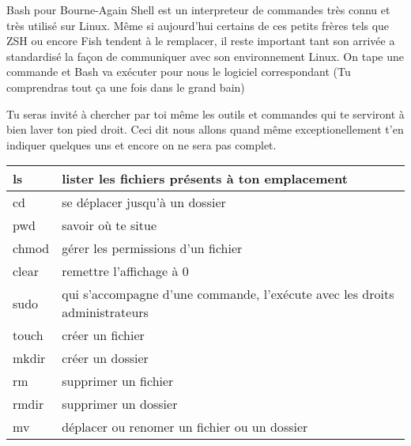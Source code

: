 \documentclass[a4paper, 12pt]{article}
\begin{document}
{\comfortaa

    Bash pour Bourne-Again Shell est un interpreteur de commandes très connu et très utilisé sur Linux. Même si aujourd'hui
    certains de ces petits frères tels que ZSH ou encore Fish tendent à le remplacer, il reste important tant
    son arrivée a standardisé la façon de communiquer avec son environnement Linux.
    \newline \newline
    On tape une commande et Bash va exécuter pour nous le logiciel correspondant
    (Tu comprendras tout ça une fois dans le grand bain)

    \vspace{0.6cm}

    Tu seras invité à chercher par toi même les outils et commandes
    qui te serviront à bien laver ton pied droit. Ceci dit nous allons
    quand même
    \newline
    exceptionellement t'en indiquer quelques uns et encore
    on ne sera pas complet.

    
    \begin{tabular}{|p{2cm}|p{14cm}|} 
        \hline
        ls & lister les fichiers présents à ton emplacement \\
        \hline
        cd & se déplacer jusqu'à un dossier \\
        \hline
        pwd & savoir où te situe \\
        \hline
        chmod & gérer les permissions d'un fichier \\
        \hline
        clear & remettre l'affichage à 0 \\
        \hline
        sudo & qui s'accompagne d'une commande, l'exécute avec les droits administrateurs \\
        \hline
        touch & créer un fichier \\
        \hline
        mkdir & créer un dossier \\
        \hline
        rm & supprimer un fichier \\
        \hline
        rmdir & supprimer un dossier \\
        \hline
        mv & déplacer ou renomer un fichier ou un dossier \\
        \hline
    \end{tabular}

}
\end{document}
